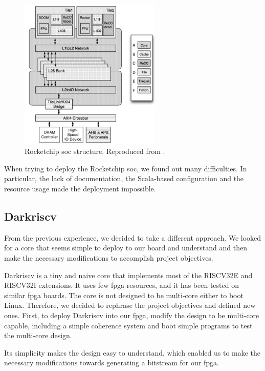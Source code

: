 \begin{figure}[h]
  \centering
  \includegraphics[width=0.6\textwidth]{images/rocket_structure.png}
  \caption{Rocketchip \gls{soc} structure. Reproduced from \cite{rocket}.}
  \label{fig:rocketstruct}
\end{figure}

When trying to deploy the Rocketchip \gls{soc}, we found out many difficulties. In particular, the lack of documentation, the Scala-based configuration and the resource usage made the deployment impossible.

\subsection{Darkriscv}
From the previous experience, we decided to take a different approach. We looked for a core that seems simple to deploy to our board and understand and then make the necessary modifications to accomplish project objectives.

Darkriscv\cite{darkriscv} is a tiny and naive core that implements most of the RISCV32E and RISCV32I extensions. It uses few \gls{fpga} resources, and it has been tested on similar \gls{fpga} boards. The core is not designed to be multi-core either to boot Linux. Therefore, we decided to rephrase the project objectives and defined new ones. First, to deploy Darkriscv into our \gls{fpga}, modify the design to be multi-core capable, including a simple coherence system and boot simple programs to test the multi-core design.

Its simplicity makes the design easy to understand, which enabled us to make the necessary modifications towards generating a bitstream for our \gls{fpga}.

